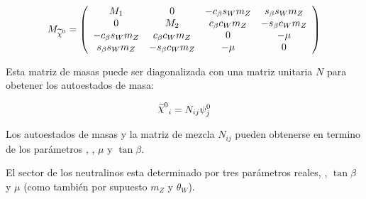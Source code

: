 \begin{equation}
  M_{\nino} = \left(
  \begin{array}{cccc}
    \M{1} & 0 & -c_\beta s_W m_Z &  s_\beta s_W m_Z \\
    0 & \M{2} & c_\beta c_W m_Z & -s_\beta c_W m_Z \\

    -c_\beta s_W m_Z & c_\beta c_W m_Z & 0 & -\mu \\
    s_\beta s_W m_Z & -s_\beta c_W m_Z & -\mu & 0 \\
  \end{array}
  \right)
\end{equation}

Esta matriz de masas puede ser diagonalizada con una matriz unitaria $N$ para obetener los autoestados
de masa:

\begin{equation}
  \nino_i = N_{ij} \psi^0_j
\end{equation}




Los autoestados de masas y la matriz de mezcla $N_{ij}$ pueden obtenerse en termino de los parámetros
, , $\mu$ y $\tan\beta$.

El sector de los neutralinos esta determinado por tres parámetros reales, , $\tan\beta$ y
$\mu$ (como también por supuesto $m_Z$ y $\theta_W$).





